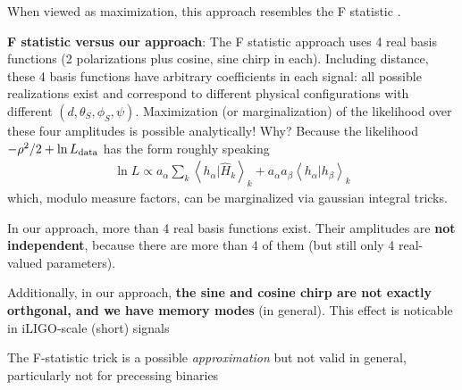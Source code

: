 \documentclass[twocolumn,prd,nofootinbib]{revtex4}
\newcommand\editremark[1]{{\color{red} #1}}
\newcommand\qmstateproduct[2]{\left\langle#1|#2\right\rangle}
\begin{document}
When viewed as maximization, this approach resembles the F statistic
\cite{1998PhRvD..58f3001J,2005PhRvD..72f3006C,2012PhRvD..86l3010K,gwastro-HarryFairhurst-CoherentTargetedSearch}\cite{BCV:PTF}.



\noindent \textbf{F statistic versus our approach}: The F statistic approach uses 4 real basis functions (2 polarizations
plus cosine, sine chirp in each).  Including distance, these 4 basis functions have arbitrary coefficients in each
signal: all possible realizations exist and correspond to different physical configurations with different
$(d,\theta_S,\phi_S,\psi)$.  Maximization (or marginalization) of the likelihood over these four amplitudes is possible
analytically! Why? Because the likelihood  $-\rho^2/2 + \ln L_{\rm data}$ has the form \editremark{roughly speaking}
\begin{eqnarray}
\ln L \propto a_\alpha \sum_k\qmstateproduct{h_\alpha}{\hat{H}_k}_k + a_\alpha a_\beta \qmstateproduct{h_{\alpha}}{h_\beta}_k
\end{eqnarray}
which, modulo measure factors, can be marginalized via gaussian integral tricks.

In our approach,  more than 4 real basis functions exist.  Their amplitudes are \textbf{not independent}, because there
are more than 4 of them (but still only 4 real-valued parameters). 

Additionally, in our approach, \textbf{the sine and cosine chirp are not exactly orthgonal, and we have memory modes}
(in general).  This effect is noticable in iLIGO-scale (short) signals

 The F-statistic trick is a possible \emph{approximation} but not valid in general, particularly  not  for precessing binaries





\end{document}
